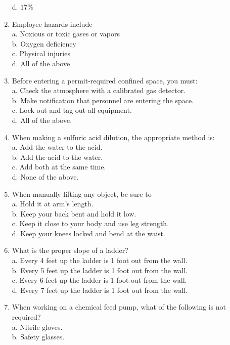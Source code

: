 \begin{enumerate}[1.]
d. $17 \%$\\
\item Employee hazards include\\
a. Noxious or toxic gases or vapors\\
b. Oxygen deficiency\\
c. Physical injuries\\
d. All of the above\\
\item Before entering a permit-required confined space, you must:\\
a. Check the atmosphere with a calibrated gas detector.\\
b. Make notification that personnel are entering the space.\\
c. Lock out and tag out all equipment.\\
d. All of the above.\\
\item When making a sulfuric acid dilution, the appropriate method is:\\
a. Add the water to the acid.\\
b. Add the acid to the water.\\
c. Add both at the same time.\\
d. None of the above.\\
\item When manually lifting any object, be sure to\\
a. Hold it at arm's length.\\
b. Keep your back bent and hold it low.\\
c. Keep it close to your body and use leg strength.\\
d. Keep your knees locked and bend at the waist.\\
\item What is the proper slope of a ladder?\\
a. Every 4 feet up the ladder is 1 foot out from the wall.\\
b. Every 5 feet up the ladder is 1 foot out from the wall.\\
c. Every 6 feet up the ladder is 1 foot out from the wall.\\
d. Every 7 feet up the ladder is 1 foot out from the wall.\\
\item When working on a chemical feed pump, what of the following is not required?\\
a. Nitrile gloves.\\
b. Safety glasses.\\

\end{enumerate}
